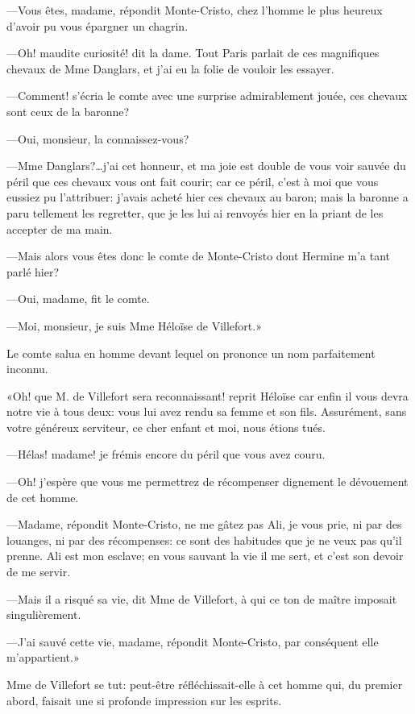 —Vous êtes, madame, répondit Monte-Cristo, chez l'homme le plus heureux d'avoir pu vous épargner un chagrin. 

—Oh! maudite curiosité! dit la dame. Tout Paris parlait de ces magnifiques chevaux de Mme Danglars, et j'ai eu la folie de vouloir les essayer. 

—Comment! s'écria le comte avec une surprise admirablement jouée, ces chevaux sont ceux de la baronne? 

—Oui, monsieur, la connaissez-vous? 

—Mme Danglars?\dots j'ai cet honneur, et ma joie est double de vous voir sauvée du péril que ces chevaux vous ont fait courir; car ce péril, c'est à moi que vous eussiez pu l'attribuer: j'avais acheté hier ces chevaux au baron; mais la baronne a paru tellement les regretter, que je les lui ai renvoyés hier en la priant de les accepter de ma main. 

—Mais alors vous êtes donc le comte de Monte-Cristo dont Hermine m'a tant parlé hier? 

—Oui, madame, fit le comte. 

—Moi, monsieur, je suis Mme Héloïse de Villefort.» 

Le comte salua en homme devant lequel on prononce un nom parfaitement inconnu. 

«Oh! que M. de Villefort sera reconnaissant! reprit Héloïse car enfin il vous devra notre vie à tous deux: vous lui avez rendu sa femme et son fils. Assurément, sans votre généreux serviteur, ce cher enfant et moi, nous étions tués. 

—Hélas! madame! je frémis encore du péril que vous avez couru. 

—Oh! j'espère que vous me permettrez de récompenser dignement le dévouement de cet homme. 

—Madame, répondit Monte-Cristo, ne me gâtez pas Ali, je vous prie, ni par des louanges, ni par des récompenses: ce sont des habitudes que je ne veux pas qu'il prenne. Ali est mon esclave; en vous sauvant la vie il me sert, et c'est son devoir de me servir. 

—Mais il a risqué sa vie, dit Mme de Villefort, à qui ce ton de maître imposait singulièrement. 

—J'ai sauvé cette vie, madame, répondit Monte-Cristo, par conséquent elle m'appartient.»  

Mme de Villefort se tut: peut-être réfléchissait-elle à cet homme qui, du premier abord, faisait une si profonde impression sur les esprits. 

